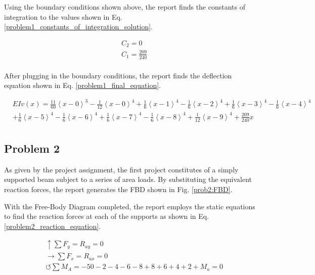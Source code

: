 \documentclass[a4paper]{article}
\begin{document}
Using the boundary conditions shown above, the report finds the constants of integration to the values shown in Eq. \ref{problem1_constants_of_integration_solution}.

\begin{equation}
\begin{split}
	& C_2 = 0 \\
	& C_1 = \frac{209}{240} \\
\end{split}
\label{problem1_constants_of_integration_solution}
\end{equation}

After plugging in the boundary conditions, the report finds the deflection equation shown in Eq. \ref{problem1_final_equation}.

\begin{equation}
\begin{split}
  & EI v(x) = \frac{11}{60}\left<x-0\right>^3 - \frac{1}{12}\left<x-0\right>^4 +  \frac{1}{6}\left<x-1\right>^4 - \frac{1}{6}\left<x-2\right>^4 + \frac{1}{6}\left<x-3\right>^4 - \frac{1}{6}\left<x-4\right>^4 \\  	  
&   +  \frac{1}{6}\left<x-5\right>^4 - \frac{1}{6}\left<x-6\right>^4  +  \frac{1}{6}\left<x-7\right>^4 - \frac{1}{6}\left<x-8\right>^4 +  \frac{1}{12}\left<x-9\right>^4 + \frac{209}{240}x\\
\end{split}
\label{problem1_final_equation}
\end{equation}

\subsection{Problem 2}

As given by the project assignment, the first project constitutes of a simply supported beam subject to a series of area loads. By substituting the equivalent reaction forces, the report generates the FBD shown in Fig. \ref{prob2:FBD}.

With the Free-Body Diagram completed, the report employs the static equations to find the reaction forces at each of the supports as shown in Eq. \ref{problem2_reaction_equation}.

\begin{equation}
\begin{split}
	&\uparrow \sum F_y = R_{ay} = 0 \\
 	&\rightarrow \sum F_x = R_{ax} = 0 \\
 	&\circlearrowleft \sum M_A = -50 - 2 - 4 - 6 - 8 + 8 + 6 + 4 + 2 + M_a = 0
\end{split}
\label{problem2_reaction_equation}
\end{equation}
\end{document}
